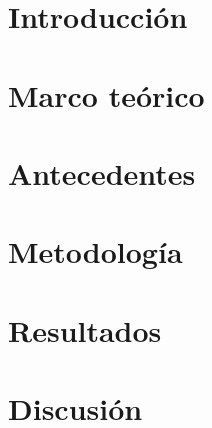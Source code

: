 \documentclass[12pt,letterpaper]{report}
\begin{document}


\tableofcontents
\newpage
\listoffigures
\newpage
{}

\chapter{Introducción}


\chapter{Marco teórico}


\chapter{Antecedentes}


\chapter{Metodología}


\chapter{Resultados}


\chapter{Discusión}


\renewcommand{\bibname}{Referencias}


\end{document}

